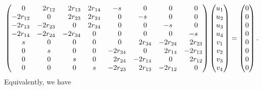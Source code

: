 \documentclass[11pt]{article}
\numberwithin{equation}{section}
\numberwithin{equation}{section}
\theoremstyle{definition}
\newcommand{\0}{\boldsymbol{0}}
\begin{document}
\begin{gather}
\begin{pmatrix}
\hphantom{-}0 & \hphantom{-}2r_{12} & \hphantom{-}2r_{13} & 2r_{14} & -s & \hphantom{-}0 & \hphantom{-}0 & \hphantom{-}0
\\
-2r_{12} & \hphantom{-}0 & \hphantom{-}2r_{23} &2r_{24} & \hphantom{-}0 & -s & \hphantom{-}0 & \hphantom{-}0
\\
-2r_{13} & -2r_{23} & \hphantom{-}0 & 2r_{34} & \hphantom{-}0 & \hphantom{-}0 & -s & \hphantom{-}0
\\
-2 r_{14} & -2r_{24} & -2r_{34} & 0 & \hphantom{-}0 & \hphantom{-}0 & \hphantom{-}0 & -s
\\
\hphantom{-}s & \hphantom{-}0 & \hphantom{-}0 & 0 & \hphantom{-}0 & \hphantom{-}2r_{34} & -2r_{24} & \hphantom{-}2r_{23}
\\
\hphantom{-}0 & \hphantom{-}s & \hphantom{-}0 & 0 & -2r_{34} & \hphantom{-}0 & \hphantom{-}2r_{14} & -2r_{13}
\\
\hphantom{-}0 & \hphantom{-}0 & \hphantom{-}s & 0 & \hphantom{-}2r_{24} & -2r_{14} & \hphantom{-}0 & \hphantom{-}2r_{12}
\\
\hphantom{-}0 & \hphantom{-}0 & \hphantom{-}0 & s & -2r_{23} & \hphantom{-}2r_{13} & -2r_{12} & \hphantom{-}0
\end{pmatrix}
\begin{pmatrix}
u_1
\\
u_2
\\
u_3
\\
u_4
\\
v_1
\\
v_2
\\
v_3
\\
v_4
\end{pmatrix} =
\begin{pmatrix}
0
\\
0
\\
0
\\
0
\\
0
\\
0
\\
0
\\
0
\end{pmatrix}. \label{star}
\end{gather}
Equivalently, we have
\end{document}
